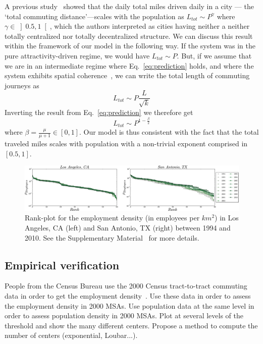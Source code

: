 A previous study~\cite{Samaniego:2008} showed that the daily total
miles driven daily in a city --- the `total commuting
distance'---scales with the population as $L_{tot} \sim P^\gamma$
where $\gamma \in \left] 0.5, 1\right[$, which the authors interpreted
as cities having neither a neither totally centralized nor totally
decentralized structure. We can discuss this result within the
framework of our model in the following way. If the system was in the
pure attractivity-driven regime, we would have $L_{tot} \sim P$. But, if we
assume that we are in an intermediate regime where
Eq.~\ref{eq:prediction} holds, and where the system exhibits spatial
coherence~\cite{SM}, we can write the total length of commuting
journeys as
%
\begin{equation}
L_{tot} \sim P \frac{L}{\sqrt{k}}
\end{equation} 
%
Inverting the result from Eq.~\ref{eq:prediction} we therefore get
%
\begin{equation}
L_{tot} \sim P^{1-\frac{\beta}{2}}
\label{eq:beta}
\end{equation}
%
where $\beta = \frac{\mu}{\mu+1} \in \left[0 , 1\right]$. Our model is
thus consistent with the fact that the total traveled miles scales with
population with a non-trivial exponent comprised in $[0.5,1]$.\\


\begin{figure}
\includegraphics[width=\textwidth]{gfx/chapter-monocentric/4.pdf}
\caption{Rank-plot for the employment density (in employees per
  $km^2$) in Los Angeles, CA (left) and San Antonio, TX (right)
  between 1994 and 2010. See the Supplementary Material~\cite{SM} for more details. \label{fig:rank_plots}}
\end{figure}

    \subsection{Empirical verification}
    \label{sub:empirical_verification}
    
People from the Census Bureau use the 2000 Census tract-to-tract commuting data
in order to get the employment density~\cite{Marlay:2010}. Use these data in
order to assess the employment density in 2000 MSAs. Use population data at the
same level in order to assess population density in 2000 MSAs.
Plot at several levels of the threshold and show the many different centers.
Propose a method to compute the number of centers (exponential, Loubar...).\\
